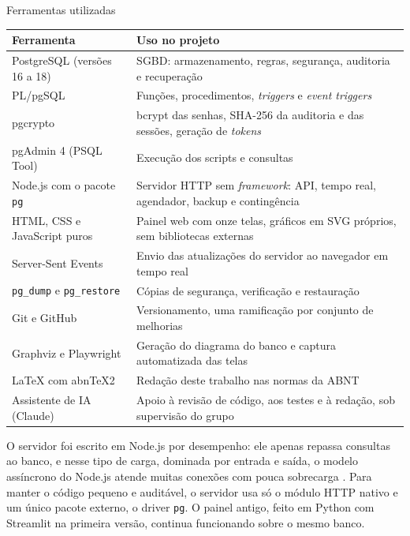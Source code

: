 \begin{quadro}[htbp]
  \caption{Ferramentas utilizadas}\label{qua:ferramentas}
  \footnotesize
  \begin{tabularx}{\textwidth}{|L{4.0cm}|Y|}
    \hline
    \textbf{Ferramenta} & \textbf{Uso no projeto} \\ \hline
    PostgreSQL (versões 16 a 18) & SGBD: armazenamento, regras, segurança, auditoria e recuperação \\ \hline
    PL/pgSQL & Funções, procedimentos, \textit{triggers} e \textit{event triggers} \\ \hline
    pgcrypto & bcrypt das senhas, SHA-256 da auditoria e das sessões, geração de \textit{tokens} \\ \hline
    pgAdmin 4 (PSQL Tool) & Execução dos scripts e consultas \\ \hline
    Node.js com o pacote \texttt{pg} & Servidor HTTP sem \textit{framework}: API, tempo real, agendador, backup e contingência \parencite{nodejs} \\ \hline
    HTML, CSS e JavaScript puros & Painel web com onze telas, gráficos em SVG próprios, sem bibliotecas externas \\ \hline
    Server-Sent Events & Envio das atualizações do servidor ao navegador em tempo real \parencite{mdnsse} \\ \hline
    \texttt{pg\_dump} e \texttt{pg\_restore} & Cópias de segurança, verificação e restauração \\ \hline
    Git e GitHub & Versionamento, uma ramificação por conjunto de melhorias \\ \hline
    Graphviz e Playwright & Geração do diagrama do banco e captura automatizada das telas \\ \hline
    \LaTeX{} com abnTeX2 & Redação deste trabalho nas normas da ABNT \\ \hline
    Assistente de IA (Claude) & Apoio à revisão de código, aos testes e à redação, sob supervisão do grupo \\ \hline
  \end{tabularx}
\end{quadro}

O servidor foi escrito em Node.js por desempenho: ele apenas repassa consultas ao banco, e nesse tipo de carga, dominada por entrada e saída, o modelo assíncrono do Node.js atende muitas conexões com pouca sobrecarga \parencite{nodejs}. Para manter o código pequeno e auditável, o servidor usa só o módulo HTTP nativo e um único pacote externo, o driver \texttt{pg}. O painel antigo, feito em Python com Streamlit na primeira versão, continua funcionando sobre o mesmo banco.

